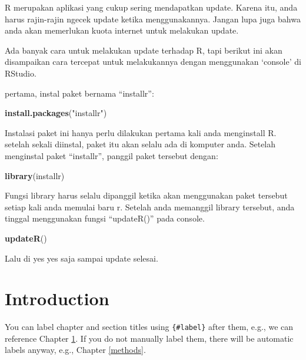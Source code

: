 \documentclass[
]{book}
\newenvironment{Shaded}{\begin{snugshade}}{\end{snugshade}}
\newcommand{\KeywordTok}[1]{\textcolor[rgb]{0.13,0.29,0.53}{\textbf{#1}}}
\newcommand{\NormalTok}[1]{#1}
\newcommand{\StringTok}[1]{\textcolor[rgb]{0.31,0.60,0.02}{#1}}
\begin{document}
R merupakan aplikasi yang cukup sering mendapatkan update. Karena itu, anda harus rajin-rajin ngecek update ketika menggunakannya. Jangan lupa juga bahwa anda akan memerlukan kuota internet untuk melakukan update.

Ada banyak cara untuk melakukan update terhadap R, tapi berikut ini akan disampaikan cara tercepat untuk melakukannya dengan menggunakan `console' di RStudio.

pertama, instal paket bernama ``installr'':

\begin{Shaded}
\begin{Highlighting}[]
\KeywordTok{install.packages}\NormalTok{(}\StringTok{"installr"}\NormalTok{)}
\end{Highlighting}
\end{Shaded}

Instalasi paket ini hanya perlu dilakukan pertama kali anda menginstall R. setelah sekali diinstal, paket itu akan selalu ada di komputer anda. Setelah menginstal paket ``installr'', panggil paket tersebut dengan:

\begin{Shaded}
\begin{Highlighting}[]
\KeywordTok{library}\NormalTok{(installr)}
\end{Highlighting}
\end{Shaded}

Fungsi library harus selalu dipanggil ketika akan menggunakan paket tersebut setiap kali anda memulai baru r. Setelah anda memanggil library tersebut, anda tinggal menggunakan fungsi ``updateR()'' pada console.

\begin{Shaded}
\begin{Highlighting}[]
\KeywordTok{updateR}\NormalTok{()}
\end{Highlighting}
\end{Shaded}

Lalu di yes yes saja sampai update selesai.

\hypertarget{intro}{%
\chapter{Introduction}\label{intro}}

You can label chapter and section titles using \texttt{\{\#label\}} after them, e.g., we can reference Chapter \ref{intro}. If you do not manually label them, there will be automatic labels anyway, e.g., Chapter \ref{methods}.
\end{document}
